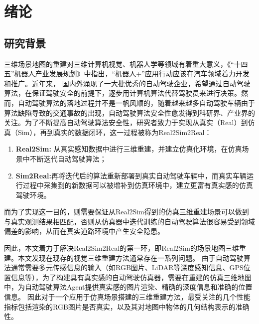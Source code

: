 %
%
%
%
%
%

\chapter{绪论}

\section{研究背景}
三维场景地图的重建对三维计算机视觉、机器人学等领域有着重大意义，《“十四五”机器人产业发展规划》中指出，“机器人+”应用行动应该在汽车领域着力开发和推广。近年来， 国内外涌现了一大批优秀的自动驾驶企业，希望通过自动驾驶算法，在保证驾驶安全的前提下，逐步用计算机算法代替驾驶员来进行决策。然而，自动驾驶算法的落地过程并不是一帆风顺的，随着越来越多自动驾驶车辆由于算法缺陷导致的交通事故的出现，自动驾驶算法安全性愈发得到科研界、产业界的关注。为了不断提高自动驾驶算法安全性，研究者致力于实现从真实（Real）到仿真（Sim），再到真实的数据闭环，这一过程被称为Real2Sim2Real：
\begin{enumerate}
    \item \textbf{Real2Sim:} 从真实感知数据中进行三维重建，并建立仿真化环境，在仿真场景中不断迭代自动驾驶算法；
    \item \textbf{Sim2Real:}再将迭代后的算法重新部署到真实自动驾驶车辆中，而真实车辆运行过程中采集到的新数据可以被增补到仿真环境中，建立更富有真实感的仿真驾驶环境。
\end{enumerate}

而为了实现这一目的，则需要保证从Real2Sim得到的仿真三维重建场景可以做到与真实观测结果相匹配，否则从仿真器中迭代训练的自动驾驶算法很容易受到领域偏差的影响，从而在真实道路环境中产生安全隐患。

因此，本文着力于解决Real2Sim2Real的第一环，即Real2Sim的场景地图三维重建。本文发现在现存的视觉三维重建方法通常存在一系列问题。
由于自动驾驶算法通常需要多元传感信息的输入（如RGB图片、LiDAR等深度感知信息、GPS位置信息等），为了构建具有真实感的自动驾驶仿真器，需要在重建的仿真三维地图中，为自动驾驶算法Agent提供真实感的图片渲染、精确的深度信息和准确的位置信息。
因此对于一个应用于仿真场景搭建的三维重建方法，最受关注的几个性能指标包括渲染的RGB图片是否真实，以及其对地图中物体的几何结构表示的准确性。

